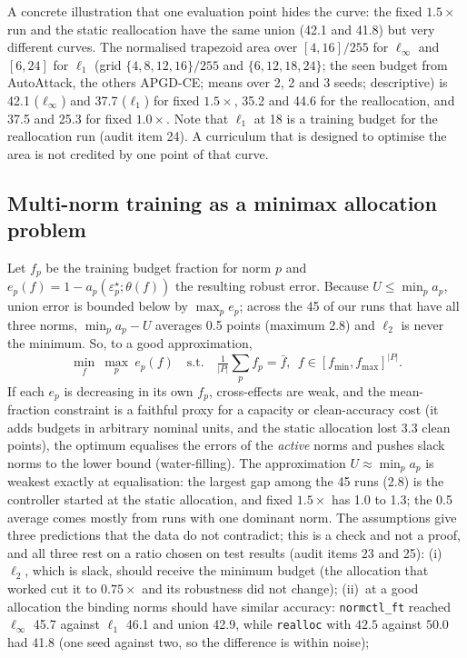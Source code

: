 \documentclass[11pt]{article}
\begin{document}
A concrete illustration that one evaluation point hides the curve: the fixed $1.5\times$ run and the static reallocation have the same union (42.1 and 41.8) but very different curves. The normalised trapezoid area over $[4,16]/255$ for $\ell_\infty$ and $[6,24]$ for $\ell_1$ (grid $\{4,8,12,16\}/255$ and $\{6,12,18,24\}$; the seen budget from AutoAttack, the others APGD-CE; means over 2, 2 and 3 seeds; descriptive) is 42.1 ($\ell_\infty$) and 37.7 ($\ell_1$) for fixed $1.5\times$, 35.2 and 44.6 for the reallocation, and 37.5 and 25.3 for fixed $1.0\times$. Note that $\ell_1$ at 18 is a training budget for the reallocation run (audit item 24). A curriculum that is designed to optimise the area is not credited by one point of that curve.

\subsection{Multi-norm training as a minimax allocation problem}\label{sec:minimax}
Let $f_p$ be the training budget fraction for norm $p$ and $e_p(f)=1-a_p(\varepsilon^\star_p;\theta(f))$ the resulting robust error. Because $U\le\min_p a_p$, union error is bounded below by $\max_p e_p$; across the 45 of our runs that have all three norms, $\min_p a_p-U$ averages 0.5 points (maximum 2.8) and $\ell_2$ is never the minimum. So, to a good approximation,
\[
\min_{f}\ \max_{p}\ e_p(f)\quad\text{s.t.}\quad \tfrac1{|P|}\sum_p f_p=\bar f,\ \ f\in[f_{\min},f_{\max}]^{|P|}.
\]
If each $e_p$ is decreasing in its own $f_p$, cross-effects are weak, and the mean-fraction constraint is a faithful proxy for a capacity or clean-accuracy cost (it adds budgets in arbitrary nominal units, and the static allocation lost 3.3 clean points), the optimum equalises the errors of the \emph{active} norms and pushes slack norms to the lower bound (water-filling). The approximation $U\approx\min_p a_p$ is weakest exactly at equalisation: the largest gap among the 45 runs (2.8) is the controller started at the static allocation, and fixed $1.5\times$ has 1.0 to 1.3; the 0.5 average comes mostly from runs with one dominant norm. The assumptions give three predictions that the data do not contradict; this is a check and not a proof, and all three rest on a ratio chosen on test results (audit items 23 and 25):
(i)~$\ell_2$, which is slack, should receive the minimum budget (the allocation that worked cut it to $0.75\times$ and its robustness did not change);
(ii)~at a good allocation the binding norms should have similar accuracy: \texttt{normctl\_ft} reached $\ell_\infty$ 45.7 against $\ell_1$ 46.1 and union 42.9, while \texttt{realloc} with $42.5$ against $50.0$ had 41.8 (one seed against two, so the difference is within noise);
\end{document}
